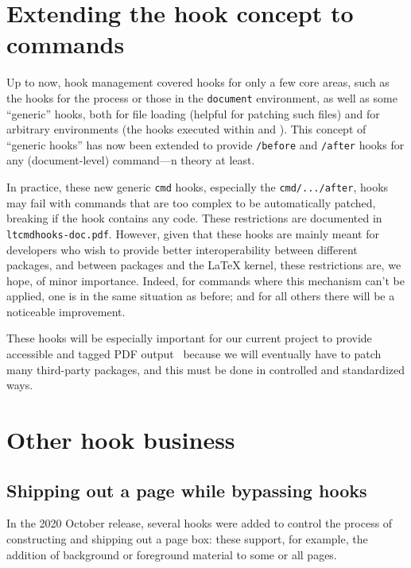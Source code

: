 \documentclass{ltnews}
\providecommand\Dash[1]{---}
\providecommand\hook[1]{\texttt{#1}}
\providecommand\env[1]{\texttt{#1}}
\providecommand\env[1]{\texttt{#1}}
\begin{document}
\section{Extending the hook concept to commands}

Up to now, hook management covered hooks for only a few core areas,
such as the hooks for the  process or those in the
\env{document} environment, as well as some \enquote {generic} hooks,
both for file loading (helpful for patching such files) and for
arbitrary environments (the hooks executed within  and
).  This concept of \enquote{generic hooks} has now been
extended to provide \hook{/before} and \hook{/after} hooks for any
(document-level) command\Dash in theory at least.


In practice, these new generic \hook{cmd} hooks, especially the
\hook{cmd/.../after}, hooks may fail with commands that are too
complex to be automatically patched, breaking if the hook contains any
code.  These restrictions are documented in
\texttt{ltcmdhooks-doc.pdf}.
%   
However, given that these hooks are mainly meant for developers who
wish to provide better interoperability between different packages,
and between packages and the \LaTeX{} kernel, these restrictions are,
we hope, of minor importance.  Indeed, for commands where this
mechanism can't be applied, one is in the same situation as before;
and for all others there will be a noticeable improvement.

These hooks will be especially important for our current project to
provide accessible and tagged PDF output~\cite{33:blueprint} because
we will eventually have to patch many third-party packages, and this
must be done in controlled and standardized ways.




\section{Other hook business}


\subsection{Shipping out a page while bypassing hooks}

In the 2020 October release, several hooks were added to control the
process of constructing and shipping out a page box: these support,
for example, the addition of background or foreground material 
to some or all pages.
\end{document}
